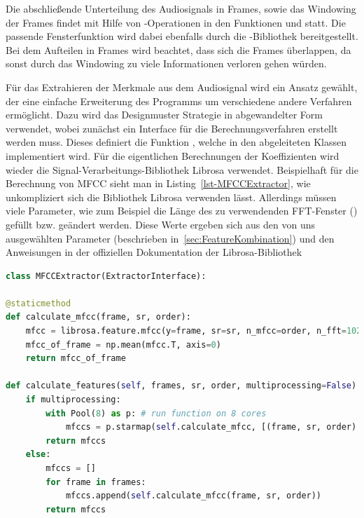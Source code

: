 Die abschließende Unterteilung des Audiosignals in Frames, sowie das Windowing der Frames findet mit Hilfe von -Operationen in den Funktionen  und  statt.
Die passende Fensterfunktion wird dabei ebenfalls durch die -Bibliothek bereitgestellt.
Bei dem Aufteilen in Frames wird beachtet, dass sich die Frames überlappen, da sonst durch das Windowing zu viele Informationen verloren gehen würden.

Für das Extrahieren der Merkmale aus dem Audiosignal wird ein Ansatz gewählt, der eine einfache Erweiterung des Programms um verschiedene andere Verfahren ermöglicht.
Dazu wird das Designmuster Strategie in abgewandelter Form verwendet, wobei zunächst ein Interface für die Berechnungsverfahren erstellt werden muss.
Dieses definiert die Funktion , welche in den abgeleiteten Klassen implementiert wird.
Für die eigentlichen Berechnungen der Koeffizienten wird wieder die Signal-Verarbeitungs-Bibliothek Librosa verwendet.
Beispielhaft für die Berechnung von \ac{MFCC} sieht man in Listing~\ref{lst-MFCCExtractor}, wie unkompliziert sich die Bibliothek Librosa verwenden lässt.
Allerdings müssen viele Parameter, wie zum Beispiel die Länge des zu verwendenden FFT-Fenster () gefüllt bzw. geändert werden.
Diese Werte ergeben sich aus den von uns ausgewählten Parameter (beschrieben in~\ref{sec:FeatureKombination}) und den Anweisungen in der offiziellen Dokumentation der Librosa-Bibliothek \autocite[vgl. ][]{librosa_development_team_librosa_2023}

\begin{lstlisting}[language=Python,numbers=none,caption=Klasse zur Extraktion von MFCC-Merkmalen,label=lst-MFCCExtractor]
class MFCCExtractor(ExtractorInterface):

@staticmethod
def calculate_mfcc(frame, sr, order):
    mfcc = librosa.feature.mfcc(y=frame, sr=sr, n_mfcc=order, n_fft=1024, hop_length=512)
    mfcc_of_frame = np.mean(mfcc.T, axis=0)
    return mfcc_of_frame

def calculate_features(self, frames, sr, order, multiprocessing=False):
    if multiprocessing:
        with Pool(8) as p: # run function on 8 cores
            mfccs = p.starmap(self.calculate_mfcc, [(frame, sr, order) for frame in frames])
        return mfccs
    else:
        mfccs = []
        for frame in frames:
            mfccs.append(self.calculate_mfcc(frame, sr, order))
        return mfccs
\end{lstlisting}

